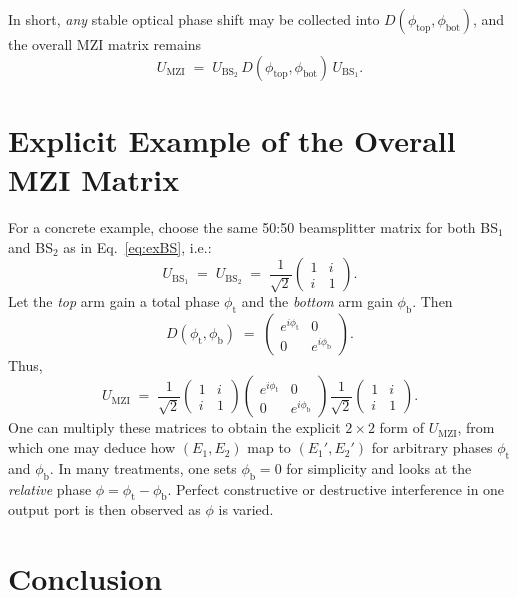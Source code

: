 \documentclass[12pt]{article}
\begin{document}
In short, \emph{any} stable optical phase shift may be collected into $D(\phi_{\text{top}}, \phi_{\text{bot}})$, and the overall MZI matrix remains
\[
  U_{\text{MZI}} 
  \;=\;
  U_{\text{BS}_2}\,
  D(\phi_{\text{top}}, \phi_{\text{bot}})\,
  U_{\text{BS}_1}.
\]

\section{Explicit Example of the Overall MZI Matrix}

For a concrete example, choose the same 50:50 beamsplitter matrix for both BS$_1$ and BS$_2$ as in Eq.~\eqref{eq:exBS}, i.e.:
\[
  U_{\text{BS}_1} 
  \;=\;
  U_{\text{BS}_2}
  \;=\;
  \frac{1}{\sqrt{2}}
  \begin{pmatrix}
    1 & i \\
    i & 1
  \end{pmatrix}.
\]
Let the \emph{top} arm gain a total phase $\phi_{\mathrm{t}}$ and the \emph{bottom} arm gain $\phi_{\mathrm{b}}$.  Then
\[
  D(\phi_{\mathrm{t}},\phi_{\mathrm{b}})
  \;=\;
  \begin{pmatrix}
    e^{i\phi_{\mathrm{t}}} & 0 \\[2pt]
    0 & e^{i\phi_{\mathrm{b}}}
  \end{pmatrix}.
\]
Thus,
\[
  U_{\text{MZI}}
  \;=\;
  \frac{1}{\sqrt{2}}
  \begin{pmatrix}
    1 & i \\
    i & 1
  \end{pmatrix}
  \begin{pmatrix}
    e^{i\phi_{\mathrm{t}}} & 0 \\
    0 & e^{i\phi_{\mathrm{b}}}
  \end{pmatrix}
  \frac{1}{\sqrt{2}}
  \begin{pmatrix}
    1 & i \\
    i & 1
  \end{pmatrix}.
\]
One can multiply these matrices to obtain the explicit $2\times 2$ form of $U_{\text{MZI}}$, from which one may deduce how $(E_1,E_2)$ map to $(E_1',E_2')$ for arbitrary phases $\phi_{\mathrm{t}}$ and $\phi_{\mathrm{b}}$.  In many treatments, one sets $\phi_{\mathrm{b}}=0$ for simplicity and looks at the \emph{relative} phase $\phi = \phi_{\mathrm{t}} - \phi_{\mathrm{b}}$.  Perfect constructive or destructive interference in one output port is then observed as $\phi$ is varied.

\section{Conclusion}
\end{document}
